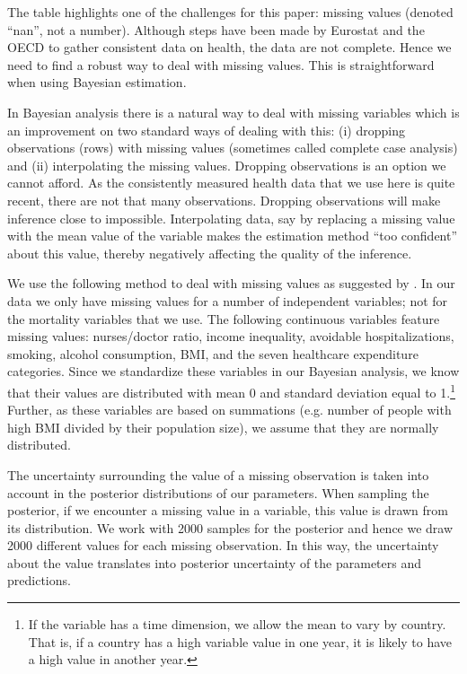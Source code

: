 \documentclass[a4paper,12pt]{article}
\begin{document}
The table highlights one of the challenges for this paper: missing values (denoted ``nan'', not a number). Although steps have been made by Eurostat and the OECD to gather consistent data on health, the data are not complete. Hence we need to find a robust way to deal with missing values. This is straightforward when using Bayesian estimation.

In Bayesian analysis there is a natural way to deal with missing variables which is an improvement on two standard ways of dealing with this: (i) dropping observations (rows) with missing values (sometimes called complete case analysis) and (ii) interpolating the missing values. Dropping observations is an option we cannot afford. As the consistently measured health data that we use here is quite recent, there are not that many observations. Dropping observations will make inference close to impossible. Interpolating data, say by replacing a missing value with the mean value of the variable makes the estimation method ``too confident'' about this value, thereby negatively affecting the quality of the inference.

We use the following method to deal with missing values as suggested by \cite{mcelreath}. In our data we only have missing values for a number of independent variables; not for the mortality variables that we use. The following continuous variables feature missing values: nurses/doctor ratio, income inequality, avoidable hospitalizations, smoking, alcohol consumption, BMI, and the seven healthcare expenditure categories. Since we standardize these variables in our Bayesian analysis, we know that their values are distributed with mean 0 and standard deviation equal to 1.\footnote{If the variable has a time dimension, we allow the mean to vary by country. That is, if a country has a high variable value in one year, it is likely to have a high value in another year.} Further, as these variables are based on summations (e.g. number of people with high BMI divided by their population size), we assume that they are normally distributed.

The uncertainty surrounding the value of a missing observation is taken into account in the posterior distributions of our parameters. When sampling the posterior, if we encounter a missing value in a variable, this value is drawn from its distribution. We work with 2000 samples for the posterior and hence we draw 2000 different values for each missing observation. In this way, the uncertainty about the value translates into posterior uncertainty of the parameters and predictions.
\end{document}
